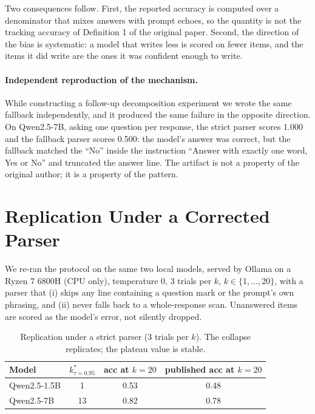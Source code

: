 \documentclass[preprint,12pt]{elsarticle}
\theoremstyle{plain}
\begin{document}
Two consequences follow. First, the reported accuracy is computed over a denominator that mixes answers with prompt echoes, so the quantity is not the tracking accuracy of Definition 1 of the original paper. Second, the direction of the bias is systematic: a model that writes less is scored on fewer items, and the items it did write are the ones it was confident enough to write.

\paragraph{Independent reproduction of the mechanism.} While constructing a follow-up decomposition experiment we wrote the same fallback independently, and it produced the same failure in the opposite direction. On Qwen2.5-7B, asking one question per response, the strict parser scores 1.000 and the fallback parser scores 0.500: the model's answer was correct, but the fallback matched the ``No'' inside the instruction ``Answer with exactly one word, Yes or No'' and truncated the answer line. The artifact is not a property of the original author; it is a property of the pattern.

\section{Replication Under a Corrected Parser}
\label{sec:replication}

We re-ran the protocol on the same two local models, served by Ollama on a Ryzen 7 6800H (CPU only), temperature 0, 3 trials per $k$, $k \in \{1,\dots,20\}$, with a parser that (i) skips any line containing a question mark or the prompt's own phrasing, and (ii) never falls back to a whole-response scan. Unanswered items are scored as the model's error, not silently dropped.

\begin{table}[H]
\centering
\small
\caption{Replication under a strict parser (3 trials per $k$). The collapse replicates; the plateau value is stable.}
\label{tab:replication}
\begin{tabular}{lccc}
\toprule
Model & $k^*_{\tau=0.95}$ & acc at $k=20$ & published acc at $k=20$ \\
\midrule
Qwen2.5-1.5B & 1  & 0.53 & 0.48 \\
Qwen2.5-7B   & 13 & 0.82 & 0.78 \\
\bottomrule
\end{tabular}
\end{table}
\end{document}
